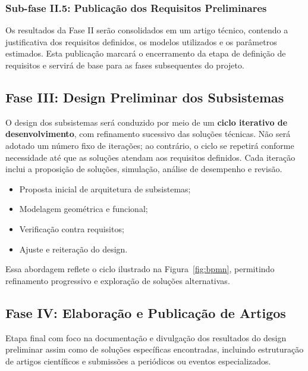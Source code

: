 \subsubsection{Sub-fase II.5: Publicação dos Requisitos Preliminares}
Os resultados da Fase II serão consolidados em um artigo técnico, contendo a justificativa dos requisitos definidos, os modelos utilizados e os parâmetros estimados. Esta publicação marcará o encerramento da etapa de definição de requisitos e servirá de base para as fases subsequentes do projeto.

\subsection{Fase III: Design Preliminar dos Subsistemas}

O design dos subsistemas será conduzido por meio de um \textbf{ciclo iterativo de desenvolvimento}, com refinamento sucessivo das soluções técnicas. Não será adotado um número fixo de iterações; ao contrário, o ciclo se repetirá conforme necessidade até que as soluções atendam aos requisitos definidos. Cada iteração inclui a proposição de soluções, simulação, análise de desempenho e revisão.

\begin{itemize}
\item Proposta inicial de arquitetura de subsistemas;
\item Modelagem geométrica e funcional;
\item Verificação contra requisitos;
\item Ajuste e reiteração do design.
\end{itemize}

Essa abordagem reflete o ciclo ilustrado na Figura~\ref{fig:bpmn}, permitindo refinamento progressivo e exploração de soluções alternativas.

\subsection{Fase IV: Elaboração e Publicação de Artigos}

Etapa final com foco na documentação e divulgação dos resultados do design preliminar assim como de soluções específicas encontradas, incluindo estruturação de artigos científicos e submissões a periódicos ou eventos especializados.